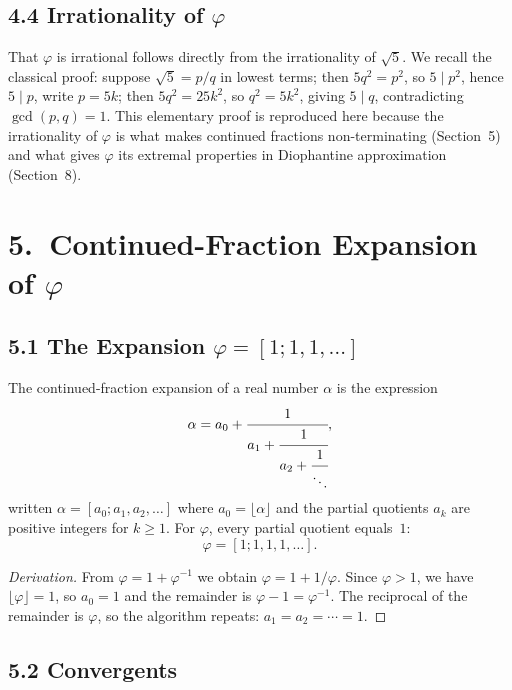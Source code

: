 \subsection{4.4 Irrationality of $\varphi$}
\label{subsec:gc-irrational}

That $\varphi$ is irrational follows directly from the
irrationality of $\sqrt{5}$.
We recall the classical proof: suppose $\sqrt{5} = p/q$
in lowest terms; then $5q^2 = p^2$, so $5 \mid p^2$,
hence $5 \mid p$, write $p = 5k$; then
$5q^2 = 25k^2$, so $q^2 = 5k^2$, giving $5 \mid q$,
contradicting $\gcd(p,q)=1$.
This elementary proof is reproduced here because the
irrationality of $\varphi$ is what makes continued
fractions non-terminating (Section~5) and what gives
$\varphi$ its extremal properties in Diophantine
approximation (Section~8).

\section{5.\ Continued-Fraction Expansion of $\varphi$}
\label{sec:gc-cf}

\subsection{5.1 The Expansion $\varphi = [1;1,1,\ldots]$}
\label{subsec:gc-cf-expansion}

The continued-fraction expansion of a real number
$\alpha$ is the expression
\[
  \alpha = a_0 + \cfrac{1}{a_1 + \cfrac{1}{a_2 + \cfrac{1}{\ddots}}},
\]
written $\alpha = [a_0; a_1, a_2, \ldots]$ where
$a_0 = \lfloor \alpha \rfloor$ and the partial quotients
$a_k$ are positive integers for $k \geq 1$.
For $\varphi$, every partial quotient equals~$1$:
\[
  \varphi = [1; 1, 1, 1, \ldots].
\]

\begin{proof}[Derivation]
From $\varphi = 1 + \varphi^{-1}$ we obtain
$\varphi = 1 + 1/\varphi$.
Since $\varphi > 1$, we have $\lfloor\varphi\rfloor = 1$,
so $a_0 = 1$ and the remainder is $\varphi - 1 = \varphi^{-1}$.
The reciprocal of the remainder is $\varphi$, so the
algorithm repeats: $a_1 = a_2 = \cdots = 1$.
\end{proof}

\subsection{5.2 Convergents}
\label{subsec:gc-convergents}

